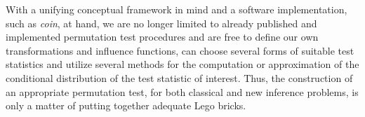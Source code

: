 \documentclass{article}
\newcommand{\Rpackage}[1]{\textit{#1}}
\newcommand{\RR}{\textsf{R}}
\renewcommand{\baselinestretch}{1.65}
\begin{document}

With a unifying conceptual framework in mind and a software implementation, such as
\Rpackage{coin}, at hand, we are no longer limited to already published and 
implemented permutation test procedures and are free to define our own transformations and
influence functions, can choose several forms of suitable test statistics and
utilize several methods for the computation or approximation of 
the conditional distribution of the test statistic of interest. Thus, the
construction of an appropriate permutation test, for both classical and
new inference problems, is only a matter of putting together
adequate Lego bricks.

\renewcommand{\baselinestretch}{1}




\clearpage

\pagestyle{empty}
\end{document}
